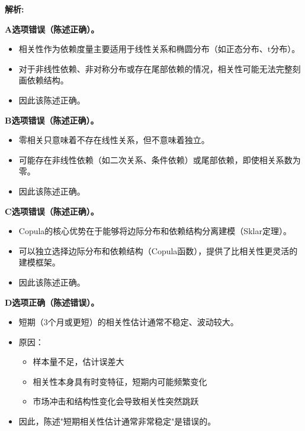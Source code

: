 \documentclass{article}
\newenvironment{explanation}
{\textbf{解析:}\par}
{\par}
\begin{document}
\begin{explanation}

    \textbf{A选项错误（陈述正确）。}
    \begin{itemize}
        \item 相关性作为依赖度量主要适用于线性关系和椭圆分布（如正态分布、t分布）。
        \item 对于非线性依赖、非对称分布或存在尾部依赖的情况，相关性可能无法完整刻画依赖结构。
        \item 因此该陈述正确。
    \end{itemize}

    \textbf{B选项错误（陈述正确）。}
    \begin{itemize}
        \item 零相关只意味着不存在线性关系，但不意味着独立。
        \item 可能存在非线性依赖（如二次关系、条件依赖）或尾部依赖，即使相关系数为零。
        \item 因此该陈述正确。
    \end{itemize}

    \textbf{C选项错误（陈述正确）。}
    \begin{itemize}
        \item Copula的核心优势在于能够将边际分布和依赖结构分离建模（Sklar定理）。
        \item 可以独立选择边际分布和依赖结构（Copula函数），提供了比相关性更灵活的建模框架。
        \item 因此该陈述正确。
    \end{itemize}

    \textbf{D选项正确（陈述错误）。}
    \begin{itemize}
        \item 短期（3个月或更短）的相关性估计通常不稳定、波动较大。
        \item 原因：
        \begin{itemize}
            \item 样本量不足，估计误差大
            \item 相关性本身具有时变特征，短期内可能频繁变化
            \item 市场冲击和结构性变化会导致相关性突然跳跃
        \end{itemize}
        \item 因此，陈述"短期相关性估计通常非常稳定"是错误的。
    \end{itemize}

\end{explanation}
\end{document}
